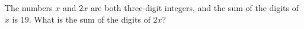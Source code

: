 The numbers $x$ and $2x$ are both three-digit integers, and the sum of the digits of $x$ is $19$. What is the sum of the digits of $2x$?
